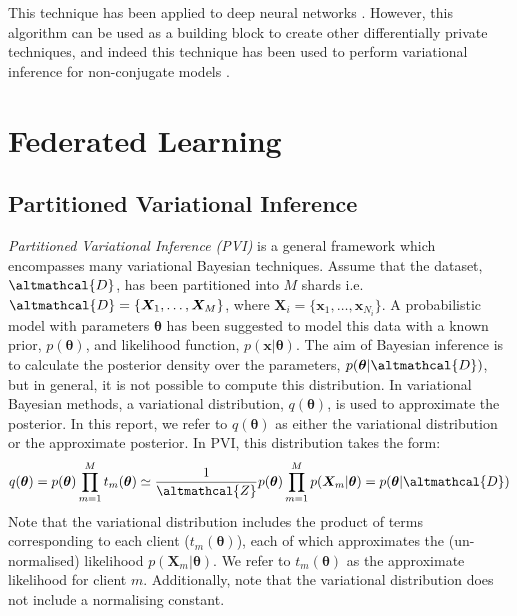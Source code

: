 This technique has been applied to deep neural networks \citep{moments_account}. However, this algorithm can be used as a building block to create other differentially private techniques, and indeed this technique has been used to perform variational inference for non-conjugate models \citep{DPVI}. 

\section{Federated Learning}
\subsection{Partitioned Variational Inference}
\emph{Partitioned Variational Inference (PVI)} is a general framework which encompasses many variational Bayesian techniques. Assume that the dataset, $\altmathcal{D}$, has been partitioned into $M$ shards i.e. $\altmathcal{D} = \lbrace \bm{X}_1, \ldots, \bm{X}_M \rbrace$, where $\bm{X}_i = \lbrace \bm{x}_1, \ldots, \bm{x}_{N_i} \rbrace$. A probabilistic model with parameters $\bm{\theta}$ has been suggested to model this data with a known prior, $p(\bm{\theta})$, and likelihood function, $p(\bm{x}| \bm{\theta})$. The aim of Bayesian inference is to calculate the posterior density over the parameters, $p(\bm{\theta}| \altmathcal{D})$, but in general, it is not possible to compute this distribution. In variational Bayesian methods, a variational distribution, $q(\bm{\theta})$, is used to approximate the posterior. In this report, we refer to $q(\bm{\theta})$ as either the variational distribution or the approximate posterior. In PVI, this distribution takes the form:
\begin{align}
q(\bm{\theta}) = p(\bm{\theta}) \prod_{m=1}^M t_m(\bm{\theta}) \simeq \frac{1}{\altmathcal{Z}} p(\bm{\theta}) \prod_{m=1}^M p(\bm{X}_m|\bm{\theta}) = p(\bm{\theta}| \altmathcal{D})
\end{align}
Note that the variational distribution includes the product of terms corresponding to each client ($t_m(\bm{\theta})$), each of which approximates the (un-normalised) likelihood $p(\bm{X}_m | \bm{\theta})$. We refer to $t_m(\bm{\theta})$ as the approximate likelihood for client $m$. Additionally, note that the variational distribution does not include a normalising constant. 

